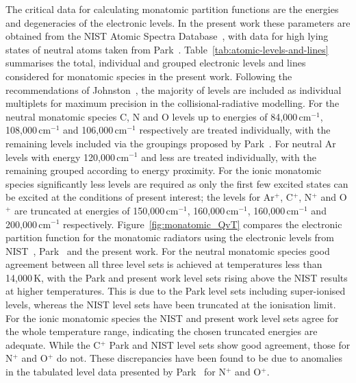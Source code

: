 The critical data for calculating monatomic partition functions are the energies and degeneracies of the electronic levels.
In the present work these parameters are obtained from the NIST Atomic Spectra Database~\cite{NIST_ASD}, with data for high lying states of neutral atoms taken from Park~\cite{park_1990}.
Table~\ref{tab:atomic-levels-and-lines} summarises the total, individual and grouped electronic levels and lines considered for monatomic species in the present work.
Following the recommendations of Johnston~\cite{JohnPhd}, the majority of levels are included as individual multiplets for maximum precision in the collisional-radiative modelling.  
For the neutral monatomic species C, N and O levels up to energies of 84,000\,cm$^{-1}$, 108,000\,cm$^{-1}$ and 106,000\,cm$^{-1}$ respectively are treated individually, with the remaining levels included via the groupings proposed by Park~\cite{park_1990}.
For neutral Ar levels with energy 120,000\,cm$^{-1}$ and less are treated individually, with the remaining grouped according to energy proximity.
For the ionic monatomic species significantly less levels are required as only the first few excited states can be excited at the conditions of present interest; the levels for Ar$^+$, C$^+$, N$^+$ and O$^+$ are truncated at energies of 150,000\,cm$^{-1}$, 160,000\,cm$^{-1}$, 160,000\,cm$^{-1}$ and 200,000\,cm$^{-1}$ respectively.
Figure~\ref{fig:monatomic_QvT} compares the electronic partition function for the monatomic radiators using the electronic levels from NIST~\cite{NIST_ASD}, Park~\cite{park_1990} and the present work.
For the neutral monatomic species good agreement between all three level sets is achieved at temperatures less than 14,000\,K, with the Park and present work level sets rising above the NIST results at higher temperatures.
This is due to the Park level sets including super-ionised levels, whereas the NIST level sets have been truncated at the ionisation limit.
For the ionic monatomic species the NIST and present work level sets agree for the whole temperature range, indicating the chosen truncated energies are adequate.
While the C$^+$ Park and NIST level sets show good agreement, those for N$^+$ and O$^+$ do not.
These discrepancies have been found to be due to anomalies in the tabulated level data presented by Park~\cite{park_1990} for N$^+$ and O$^+$.


